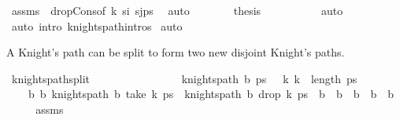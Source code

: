 \begin{isabellebody}
\ assms\ {}\ drop{\isacharunderscore}{\kern0pt}Cons{\isacharprime}{\kern0pt}{\isacharbrackleft}{\kern0pt}of\ k\ s\isactrlsub i\ {\isachardoublequoteopen}s\isactrlsub j{\isacharhash}{\kern0pt}ps{\isachardoublequoteclose}{\isacharbrackright}{\kern0pt}\ \isamarkupfalse%
\ auto\isanewline
\ \ \ \ \isamarkupfalse%
\ \isamarkupfalse%
\ {\isacharquery}{\kern0pt}thesis\isanewline
\ \ \ \ \ \ \isamarkupfalse%
\ {}\ \isamarkupfalse%
\ auto\isanewline
\ \ \isamarkupfalse%
\ {\isacharparenleft}{\kern0pt}auto\ intro{\isacharcolon}{\kern0pt}\ knights{\isacharunderscore}{\kern0pt}path{\isachardot}{\kern0pt}intros{\isacharparenright}{\kern0pt}\isanewline
{}\isamarkupfalse%
\ auto%
\endisatagproof
{\isafoldproof}%
%
\isadelimproof
%
\endisadelimproof
%
\begin{isamarkuptext}%
A Knight's path can be split to form two new disjoint Knight's paths.%
\end{isamarkuptext}\isamarkuptrue%
\isamarkupfalse%
\ knights{\isacharunderscore}{\kern0pt}path{\isacharunderscore}{\kern0pt}split{\isacharcolon}{\kern0pt}\ \ \ \ \ \ \ \ \ \ \ \ \ \isanewline
\ \ \ {\isachardoublequoteopen}knights{\isacharunderscore}{\kern0pt}path\ b\ ps{\isachardoublequoteclose}\ {\isachardoublequoteopen}{}\ {\isacharless}{\kern0pt}\ k{\isachardoublequoteclose}\ {\isachardoublequoteopen}k\ {\isacharless}{\kern0pt}\ length\ ps{\isachardoublequoteclose}\isanewline
\ \ \ \isanewline
\ \ \ \ {\isachardoublequoteopen}{\isasymexists}b\ b\ knights{\isacharunderscore}{\kern0pt}path\ b\ {\isacharparenleft}{\kern0pt}take\ k\ ps{\isacharparenright}{\kern0pt}\ {\isasymand}\ knights{\isacharunderscore}{\kern0pt}path\ b\ {\isacharparenleft}{\kern0pt}drop\ k\ ps{\isacharparenright}{\kern0pt}\ {\isasymand}\ b\ {\isasymunion}\ b\ {\isacharequal}{\kern0pt}\ b\ {\isasymand}\ b\ {\isasyminter}\ b\ {\isacharequal}{\kern0pt}\ {\isacharbraceleft}{\kern0pt}{\isacharbraceright}{\kern0pt}{\isachardoublequoteclose}\isanewline
%
\isadelimproof
\ \ %
\endisadelimproof
%
\isatagproof
{}\isamarkupfalse%
\ assms\isanewline
{}\isamarkupfalse%
\ {\isacharminus}{\kern0pt}\isanewline
\ \ \isamarkupfalse%

\end{isabellebody}
